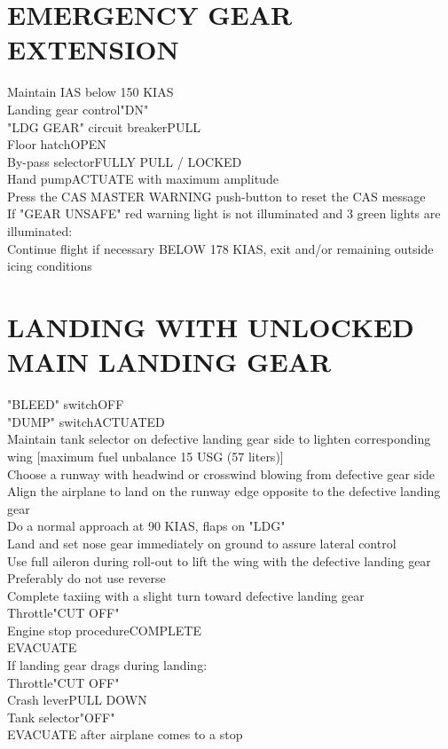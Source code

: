 \documentclass{article}
\newcommand{\warning}[1]{\colorbox{Black}{\color{Orange}{#1}}}
\begin{document}
\begin{multicols*}{2}
\section*{EMERGENCY GEAR EXTENSION}
Maintain IAS below 150 KIAS\\
Landing gear control\dotfill "DN"\\
"LDG GEAR" circuit breaker\dotfill PULL\\
Floor hatch\dotfill OPEN\\
By-pass selector\dotfill FULLY PULL / LOCKED\\
Hand pump\dotfill ACTUATE with maximum amplitude\\
Press the CAS MASTER WARNING push-button to reset the \warning{GEAR UNSAFE} CAS message\\
If "GEAR UNSAFE" red warning light is not illuminated and 3 green lights are illuminated:\\
\hspace*{6mm} Continue flight if necessary BELOW 178 KIAS, exit and/or remaining outside icing conditions
\section*{LANDING WITH UNLOCKED MAIN LANDING GEAR}
"BLEED" switch\dotfill OFF\\
"DUMP" switch\dotfill ACTUATED\\
Maintain tank selector on defective landing gear side to lighten corresponding wing [maximum fuel unbalance 15 USG (57 liters)]\\
Choose a runway with headwind or crosswind blowing from defective gear side\\
Align the airplane to land on the runway edge opposite to the defective landing gear\\
Do a normal approach at 90 KIAS, flaps on "LDG"\\
Land and set nose gear immediately on ground to assure lateral control\\
Use full aileron during roll-out to lift the wing with the defective landing gear\\
Preferably do not use reverse\\
Complete taxiing with a slight turn toward defective landing gear\\
Throttle\dotfill "CUT OFF"\\
Engine stop procedure\dotfill COMPLETE\\
EVACUATE\\
If landing gear drags during landing:\\
\hspace*{6mm} Throttle\dotfill "CUT OFF"\\
\hspace*{6mm} Crash lever\dotfill PULL DOWN\\
\hspace*{6mm} Tank selector\dotfill "OFF"\\
\hspace*{6mm} EVACUATE after airplane comes to a stop

\end{multicols*}
\end{document}
